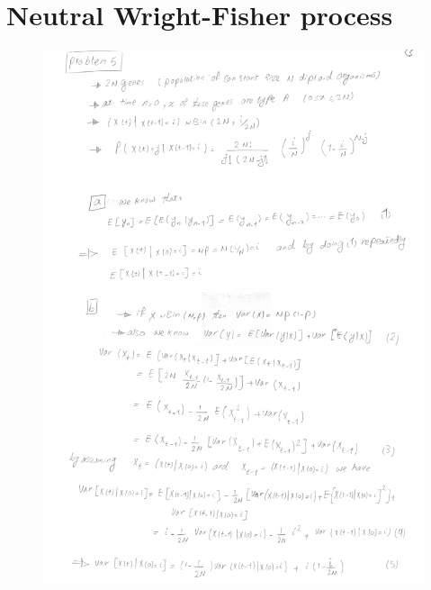 \section{Neutral Wright-Fisher process}
\begin{figure}[htbp]
\centering
\includegraphics[scale=0.8, page=1]{./img/ex5}
\end{figure}
